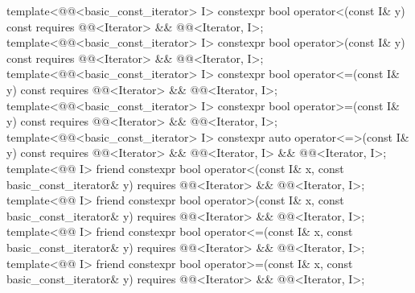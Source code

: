 \begin{codeblock}
{{    template<@@<basic_const_iterator> I>
      constexpr bool operator<(const I& y) const
        requires @@<Iterator> && @@<Iterator, I>;
    template<@@<basic_const_iterator> I>
      constexpr bool operator>(const I& y) const
        requires @@<Iterator> && @@<Iterator, I>;
    template<@@<basic_const_iterator> I>
      constexpr bool operator<=(const I& y) const
        requires @@<Iterator> && @@<Iterator, I>;
    template<@@<basic_const_iterator> I>
      constexpr bool operator>=(const I& y) const
        requires @@<Iterator> && @@<Iterator, I>;
    template<@@<basic_const_iterator> I>
      constexpr auto operator<=>(const I& y) const
        requires @@<Iterator> && @@<Iterator, I> &&
                 @@<Iterator, I>;
    template<@@ I>
      friend constexpr bool operator<(const I& x, const basic_const_iterator& y)
        requires @@<Iterator> && @@<Iterator, I>;
    template<@@ I>
      friend constexpr bool operator>(const I& x, const basic_const_iterator& y)
        requires @@<Iterator> && @@<Iterator, I>;
    template<@@ I>
      friend constexpr bool operator<=(const I& x, const basic_const_iterator& y)
        requires @@<Iterator> && @@<Iterator, I>;
    template<@@ I>
      friend constexpr bool operator>=(const I& x, const basic_const_iterator& y)
        requires @@<Iterator> && @@<Iterator, I>;

}}
\end{codeblock}
